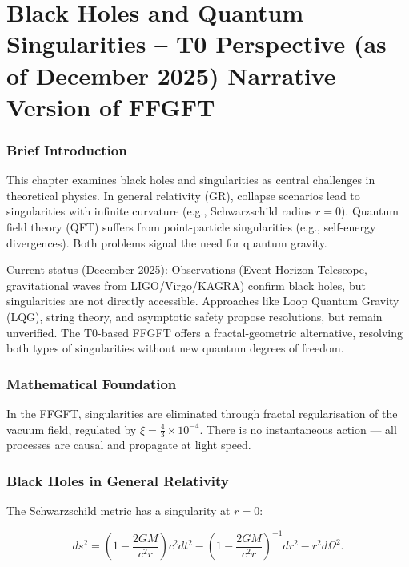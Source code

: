 \chapter{Black Holes and Quantum Singularities – T0 Perspective (as of December 2025)  Narrative Version of FFGFT}


	
	\subsection*{Brief Introduction}
	
	This chapter examines black holes and singularities as central challenges in theoretical physics. In general relativity (GR), collapse scenarios lead to singularities with infinite curvature (e.g., Schwarzschild radius \(r=0\)). Quantum field theory (QFT) suffers from point-particle singularities (e.g., self-energy divergences). Both problems signal the need for quantum gravity.
	
	Current status (December 2025): Observations (Event Horizon Telescope, gravitational waves from LIGO/Virgo/KAGRA) confirm black holes, but singularities are not directly accessible. Approaches like Loop Quantum Gravity (LQG), string theory, and asymptotic safety propose resolutions, but remain unverified. The T0-based FFGFT offers a fractal-geometric alternative, resolving both types of singularities without new quantum degrees of freedom.
	
	\subsection*{Mathematical Foundation}
	
	In the FFGFT, singularities are eliminated through fractal regularisation of the vacuum field, regulated by \(\xi = \frac{4}{3} \times 10^{-4}\). There is no instantaneous action — all processes are causal and propagate at light speed.
	
	\subsection*{Black Holes in General Relativity}
	
	The Schwarzschild metric has a singularity at \(r=0\):
	
	\begin{equation}
		ds^2 = \left(1 - \frac{2GM}{c^2 r}\right) c^2 dt^2 - \left(1 - \frac{2GM}{c^2 r}\right)^{-1} dr^2 - r^2 d\Omega^2.
	\end{equation}
	
